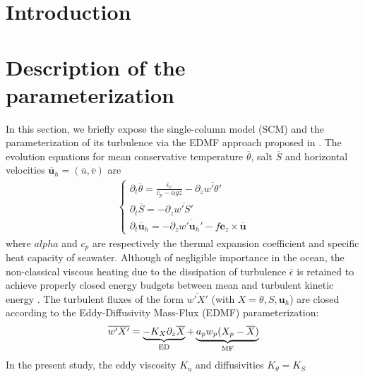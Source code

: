 \documentclass[draft]{agujournal2019}
\begin{document}
%
%


\section{Introduction}

\section{Description of the parameterization}

In this section, we briefly expose the single-column model (SCM) and the parameterization of its turbulence via the EDMF approach proposed in . The evolution equations for mean conservative temperature $\overline{\theta}$, salt $\overline{S}$ and horizontal velocities $\overline{\bm u}_h = (\overline{u},\overline{v})$ are 
%
\begin{eqnarray*}
    \begin{cases}
        \partial_t \overline{\theta} = \frac{\overline{\epsilon}_\nu }{c_p - \alpha gz } - \partial_z \overline{w' \theta'} \label{eq:temp budget}
        \\
        \partial_t \overline{S} = - \partial_z \overline{w' S'}
        \\
        \partial_t \overline{\bm u}_h = - \partial_z \overline{w' \bm u_h'} - f \bm e_z \times \overline{\bm u}
    \end{cases}
\end{eqnarray*}
%
where $alpha$ and $c_p$ are respectively the thermal expansion coefficient and specific heat capacity of seawater. Although of negligible importance in the ocean, the non-classical viscous heating due to the dissipation of turbulence $\overline{\epsilon}$ is retained to achieve  properly closed energy budgets between mean and turbulent kinetic energy \cite{perrotEnergeticallyConsistentEddyDiffusivity2024}. The turbulent fluxes of the form $\overline{w'X'}$ (with $X=\theta,S,\bm u_h$) are closed according to the Eddy-Diffusivity Mass-Flux (EDMF) parameterization:
%
\begin{eqnarray*}
    \overline{w'X'} = \underbrace{-K_X \partial_z \overline{X}}_{\rm{ED}} + \underbrace{a_p w_p (X_p - \overline{X})}_{\rm{MF}}
\end{eqnarray*}
%
In the present study, the eddy viscosity $K_u$ and diffusivities $K_\theta=K_S$ 
\end{document}
